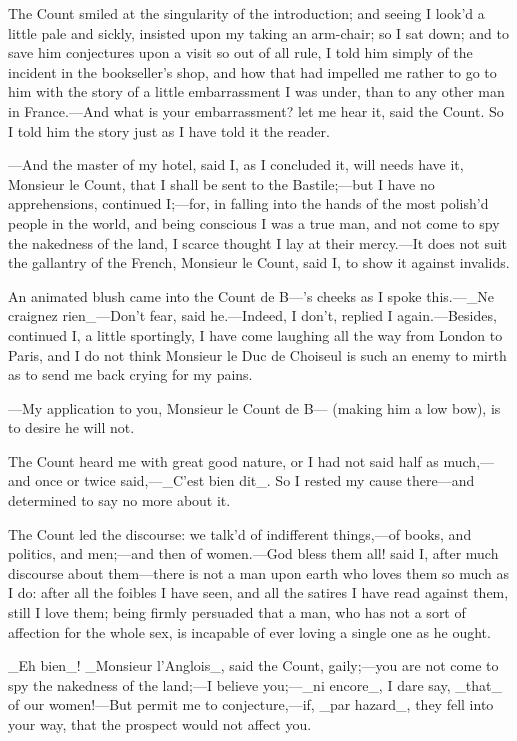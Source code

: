 \documentclass[twoside]{article}
\begin{document}
The Count smiled at the singularity of the introduction; and seeing I
look’d a little pale and sickly, insisted upon my taking an arm-chair; so
I sat down; and to save him conjectures upon a visit so out of all rule,
I told him simply of the incident in the bookseller’s shop, and how that
had impelled me rather to go to him with the story of a little
embarrassment I was under, than to any other man in France.—And what is
your embarrassment? let me hear it, said the Count.  So I told him the
story just as I have told it the reader.

—And the master of my hotel, said I, as I concluded it, will needs have
it, Monsieur le Count, that I shall be sent to the Bastile;—but I have no
apprehensions, continued I;—for, in falling into the hands of the most
polish’d people in the world, and being conscious I was a true man, and
not come to spy the nakedness of the land, I scarce thought I lay at
their mercy.—It does not suit the gallantry of the French, Monsieur le
Count, said I, to show it against invalids.

An animated blush came into the Count de B—’s cheeks as I spoke this.—_Ne
craignez rien_—Don’t fear, said he.—Indeed, I don’t, replied I
again.—Besides, continued I, a little sportingly, I have come laughing
all the way from London to Paris, and I do not think Monsieur le Duc de
Choiseul is such an enemy to mirth as to send me back crying for my
pains.

—My application to you, Monsieur le Count de B— (making him a low bow),
is to desire he will not.

The Count heard me with great good nature, or I had not said half as
much,—and once or twice said,—_C’est bien dit_.  So I rested my cause
there—and determined to say no more about it.

The Count led the discourse: we talk’d of indifferent things,—of books,
and politics, and men;—and then of women.—God bless them all! said I,
after much discourse about them—there is not a man upon earth who loves
them so much as I do: after all the foibles I have seen, and all the
satires I have read against them, still I love them; being firmly
persuaded that a man, who has not a sort of affection for the whole sex,
is incapable of ever loving a single one as he ought.

_Eh bien_!  _Monsieur l’Anglois_, said the Count, gaily;—you are not come
to spy the nakedness of the land;—I believe you;—_ni encore_, I dare say,
_that_ of our women!—But permit me to conjecture,—if, _par hazard_, they
fell into your way, that the prospect would not affect you.
\end{document}
